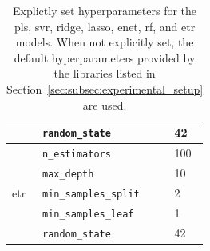 \begin{table}[h]
\begin{tabular}{@{}llp{}@{}}
& \texttt{random\_state} & 42 \\
\midrule
\multirow{5}{*}{\gls{etr}}
& \texttt{n\_estimators} & 100 \\
& \texttt{max\_depth} & 10 \\
& \texttt{min\_samples\_split} & 2 \\
& \texttt{min\_samples\_leaf} & 1 \\
& \texttt{random\_state} & 42 \\
\midrule
\end{tabular}
\caption{Explictly set hyperparameters for the \gls{pls}, \gls{svr}, ridge, \gls{lasso}, \gls{enet}, \gls{rf}, and \gls{etr} models. When not explicitly set, the default hyperparameters provided by the libraries listed in Section~\ref{sec:subsec:experimental_setup} are used.}
\label{tab:combined_hyperparameters}
\end{table}


